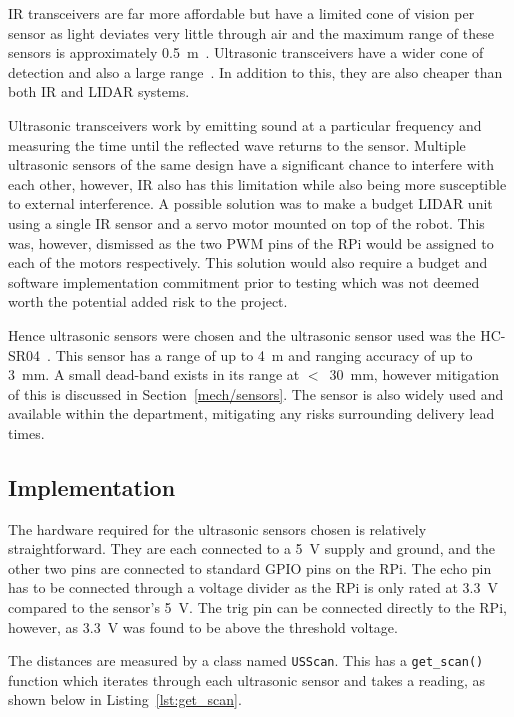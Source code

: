 IR transceivers are far more affordable but have a limited cone of
vision per sensor as light deviates very little through air and the
maximum range of these sensors is approximately \SI{0.5}{\m}~\cite{InfraredDatasheet}.
Ultrasonic transceivers have a wider cone of
detection and also a large range~\cite{HCSR04datasheet}. In addition to
this, they are also cheaper than both IR and LIDAR systems.

Ultrasonic transceivers work by emitting sound at a particular frequency
and measuring the time until the reflected wave returns to the sensor.
Multiple ultrasonic sensors of the same design have a significant chance to interfere with each other,
however, IR also has this limitation
while also being more susceptible to external interference. A possible solution
was to make a budget LIDAR unit using a single IR sensor and a
servo motor mounted on top of the robot. This was, however, dismissed as
the two PWM pins of the RPi would be assigned to each of the
motors respectively. This solution would also require a budget and
software implementation commitment prior to testing which was not deemed
worth the potential added risk to the project.

Hence ultrasonic sensors were chosen and the ultrasonic sensor used was
the HC-SR04~\cite{HCSR04datasheet}. This sensor has a range of up to \SI{4}{\m} and
ranging accuracy of up to \SI{3}{\mm}. A small dead-band exists in its
range at $<$~\SI{30}{\mm}, however mitigation of this is discussed in Section~\ref{mech/sensors}. The sensor is also widely used and available within the
department, mitigating any risks surrounding delivery lead times.

\subsection{Implementation}\label{elec/range/impl}
The hardware required for the ultrasonic sensors chosen is relatively straightforward.
They are each connected to a \SI{5}{\volt} supply and ground, and the other two pins are
connected to standard GPIO pins on the RPi. The echo pin has to be connected through
a voltage divider as the RPi is only rated at \SI{3.3}{\volt} compared to the sensor's \SI{5}{\volt}. The
trig pin can be connected directly to the RPi, however, as \SI{3.3}{\volt} was found to be above
the threshold voltage.

The distances are measured by a class named \verb|USScan|. This has a
\verb|get_scan()| function which iterates through each ultrasonic sensor and takes a reading,
as shown below in Listing~\ref{lst:get_scan}.

